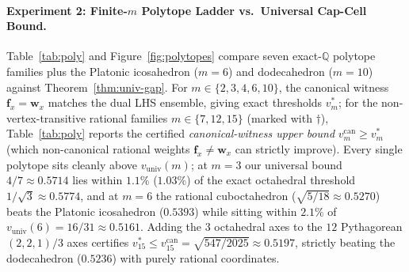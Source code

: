 \documentclass[11pt,a4paper]{article}
\theoremstyle{definition}
\theoremstyle{remark}
\newcommand{\QQ}{\mathbb{Q}}
\begin{document}
\paragraph{Experiment 2: Finite-$m$ Polytope Ladder vs.\ Universal Cap-Cell Bound.}
Table~\ref{tab:poly} and Figure~\ref{fig:polytopes} compare seven exact-$\QQ$ polytope families plus the Platonic icosahedron ($m=6$) and dodecahedron ($m=10$) against Theorem~\ref{thm:univ-gap}. For $m \in \{2,3,4,6,10\}$, the canonical witness $\mathbf{f}_x = \mathbf{w}_x$ matches the dual LHS ensemble, giving exact thresholds $v_m^*$; for the non-vertex-transitive rational families $m \in \{7,12,15\}$ (marked with $\dagger$), Table~\ref{tab:poly} reports the certified \emph{canonical-witness upper bound} $v_m^{\mathrm{can}} \ge v_m^*$ (which non-canonical rational weights $\mathbf{f}_x \neq \mathbf{w}_x$ can strictly improve). Every single polytope sits cleanly above $v_{\mathrm{univ}}(m)$; at $m=3$ our universal bound $4/7 \approx 0.5714$ lies within $1.1\%$ ($1.03\%$) of the exact octahedral threshold $1/\sqrt{3} \approx 0.5774$, and at $m=6$ the rational cuboctahedron ($\sqrt{5/18} \approx 0.5270$) beats the Platonic icosahedron ($0.5393$) while sitting within $2.1\%$ of $v_{\mathrm{univ}}(6) = 16/31 \approx 0.5161$. Adding the $3$ octahedral axes to the $12$ Pythagorean $(2,2,1)/3$ axes certifies $v_{15}^* \le v_{15}^{\mathrm{can}} = \sqrt{547/2025} \approx 0.5197$, strictly beating the dodecahedron ($0.5236$) with purely rational coordinates.
\end{document}
